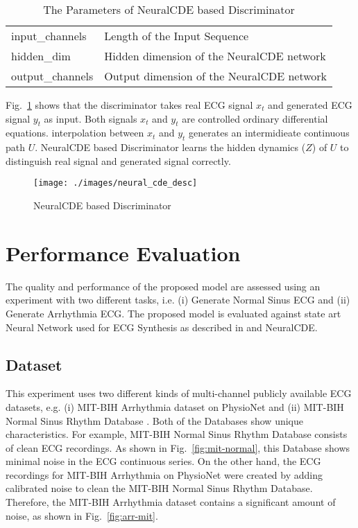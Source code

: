 \documentclass{article}
\begin{document}
\begin{table}[htb]
	\caption{The Parameters of NeuralCDE based Discriminator}
	\centering
	\begin{tabular}{ll}
		\toprule		
		input\_channels     &  Length of the Input Sequence     \\
		
		hidden\_dim & Hidden dimension of the  NeuralCDE network   \\
		output\_channels     & Output dimension of the  NeuralCDE network    \\	
		\bottomrule
	\end{tabular}
	\label{tab:desc3}
\end{table}

Fig.~\ref{fig:neural_cde_desc} shows that the discriminator takes real ECG signal $x_{t}$ and generated  ECG signal $y_{t}$ as input. Both signals $x_{t}$ and $y_{t}$ are controlled ordinary differential equations.  interpolation between $x_{t}$ and $y_{t}$ generates an intermidieate continuous path $U$. NeuralCDE based Discriminator learns the hidden dynamics ($Z$) of $U$ to distinguish real signal and generated signal correctly. 

\begin{figure}
    \centering
    \texttt{[image: ./images/neural\_cde\_desc]}
    \caption{NeuralCDE based Discriminator}
    \label{fig:neural_cde_desc}
\end{figure}


\section{Performance Evaluation}
\label{sec:experiments}
The quality and performance of the proposed model are assessed using an experiment with two different tasks, i.e. (i) Generate Normal Sinus ECG and (ii) Generate Arrhythmia ECG. The proposed model is evaluated against state art Neural Network used for ECG Synthesis as described in \cite{delaney2019synthesis} and NeuralCDE.

\subsection{Dataset}
This experiment uses two different kinds of multi-channel publicly available ECG datasets, e.g. (i)   MIT-BIH Arrhythmia dataset on PhysioNet \cite{goldberger2000physiobank} and  (ii) MIT-BIH Normal Sinus Rhythm Database \cite{goldberger2000physiobank}. Both of the Databases show unique characteristics. For example,  MIT-BIH Normal Sinus Rhythm Database consists of clean ECG recordings. As shown in Fig.~\ref{fig:mit-normal}, this Database shows minimal noise in the ECG continuous series. On the other hand, the ECG recordings for MIT-BIH Arrhythmia on PhysioNet were created by adding calibrated noise to clean the MIT-BIH Normal Sinus Rhythm Database. Therefore, the MIT-BIH Arrhythmia dataset contains a significant amount of noise, as shown in Fig.~\ref{fig:arr-mit}.
\end{document}
